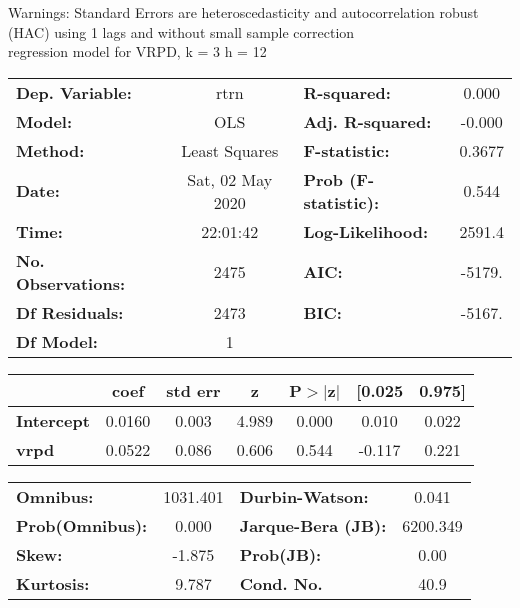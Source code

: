 Warnings: \newline
 [1] Standard Errors are heteroscedasticity and autocorrelation robust (HAC) using 1 lags and without small sample correction\\ 

regression model for VRPD, k = 3 h = 12\begin{center}
\begin{tabular}{lclc}
\toprule
\textbf{Dep. Variable:}    &       rtrn       & \textbf{  R-squared:         } &     0.000   \\
\textbf{Model:}            &       OLS        & \textbf{  Adj. R-squared:    } &    -0.000   \\
\textbf{Method:}           &  Least Squares   & \textbf{  F-statistic:       } &    0.3677   \\
\textbf{Date:}             & Sat, 02 May 2020 & \textbf{  Prob (F-statistic):} &    0.544    \\
\textbf{Time:}             &     22:01:42     & \textbf{  Log-Likelihood:    } &    2591.4   \\
\textbf{No. Observations:} &        2475      & \textbf{  AIC:               } &    -5179.   \\
\textbf{Df Residuals:}     &        2473      & \textbf{  BIC:               } &    -5167.   \\
\textbf{Df Model:}         &           1      & \textbf{                     } &             \\
\bottomrule
\end{tabular}
\begin{tabular}{lcccccc}
                   & \textbf{coef} & \textbf{std err} & \textbf{z} & \textbf{P$> |$z$|$} & \textbf{[0.025} & \textbf{0.975]}  \\
\midrule
\textbf{Intercept} &       0.0160  &        0.003     &     4.989  &         0.000        &        0.010    &        0.022     \\
\textbf{vrpd}      &       0.0522  &        0.086     &     0.606  &         0.544        &       -0.117    &        0.221     \\
\bottomrule
\end{tabular}
\begin{tabular}{lclc}
\textbf{Omnibus:}       & 1031.401 & \textbf{  Durbin-Watson:     } &    0.041  \\
\textbf{Prob(Omnibus):} &   0.000  & \textbf{  Jarque-Bera (JB):  } & 6200.349  \\
\textbf{Skew:}          &  -1.875  & \textbf{  Prob(JB):          } &     0.00  \\
\textbf{Kurtosis:}      &   9.787  & \textbf{  Cond. No.          } &     40.9  \\
\bottomrule
\end{tabular}
\end{center}


